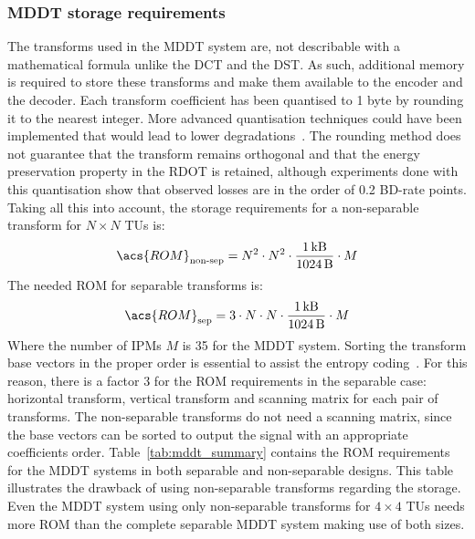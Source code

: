 \documentclass[11pt,a4paper,openright,twoside]{book}
\numberwithin{equation}{section} %
\numberwithin{figure}{section} %
\numberwithin{table}{section} %
\begin{document}
\subsubsection{\acs{MDDT} storage requirements}
\label{ssub:mddt_storage_requirements}

The transforms used in the \ac{MDDT} system are, not describable with a
mathematical formula unlike the \ac{DCT} and the \ac{DST}.
As such, additional memory is required to store these transforms and make them
available to the encoder and the decoder.
Each transform coefficient has been quantised to 1 byte by rounding it to the
nearest integer.
More advanced quantisation techniques could have been implemented that would
lead to lower degradations~\cite{britanak-06-dct-and-dst}.
The rounding method does not guarantee that the transform remains orthogonal
and that the energy preservation property in the \ac{RDOT} is retained,
although experiments done with this quantisation show that observed losses are
in the order of 0.2 \ac{BD}-rate points.
Taking all this into account, the storage requirements for a non-separable
transform for $N\times N$ \acp{TU} is:
\begin{equation}
	\acs{ROM}_{\text{non-sep}} =
	N^2 \cdot N^2 \cdot \frac{\SI{1}{\kilo B}}{\SI{1024}{B}} \cdot M
	\label{eqn:rom_nsep}
\end{equation}
The needed \acs{ROM} for separable transforms is:
\begin{equation}
	\acs{ROM}_{\text{sep}} =
	3 \cdot N \cdot N \cdot \frac{\SI{1}{\kilo B}}{\SI{1024}{B}} \cdot M
	\label{eqn:rom_sep}
\end{equation}
Where the number of \acp{IPM} $M$ is 35 for the \ac{MDDT} system.
Sorting the transform base vectors in the proper order is essential to assist
the entropy coding~\cite{ye-08-intra-directional-scanning-mddt}.
For this reason, there is a factor 3 for the \acs{ROM} requirements in the
separable case: horizontal transform, vertical transform and scanning matrix
for each pair of transforms.
The non-separable transforms do not need a scanning matrix, since the base
vectors can be sorted to output the signal with an appropriate coefficients
order.
Table~\ref{tab:mddt_summary} contains the \acs{ROM} requirements for the
\ac{MDDT} systems in both separable and non-separable designs.
This table illustrates the drawback of using non-separable transforms
regarding the storage.
Even the \ac{MDDT} system using only non-separable transforms for $4\times4$
\acp{TU} needs more \acs{ROM} than the complete separable \ac{MDDT} system
making use of both sizes.
\end{document}
